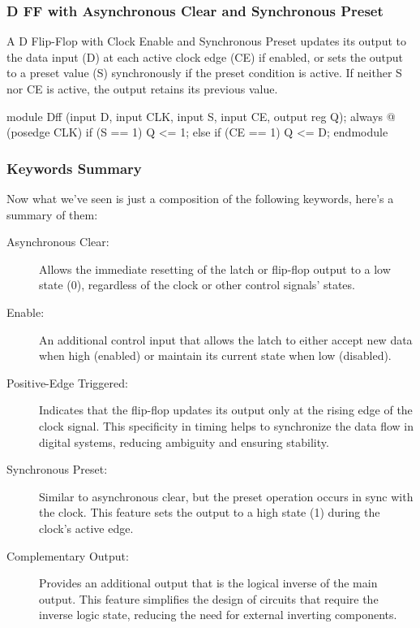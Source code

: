 \documentclass[12pt,openany]{book}
\begin{document}
\subsubsection{D FF with Asynchronous Clear and Synchronous Preset}
A D Flip-Flop with Clock Enable and Synchronous Preset updates its output to the data input (D) at each active clock edge (CE) if enabled, or sets the output to a preset value (S) synchronously if the preset condition is active. \vspace*{5px}
\newline If neither S nor CE is active, the output retains its previous value.
\begin{vhdl}
module Dff (input D, input CLK, input S, input CE, output reg Q);
	always @ (posedge CLK)
		if (S == 1)
			Q <= 1;
		else if (CE == 1)
			Q <= D;
endmodule
\end{vhdl}
\subsubsection{Keywords Summary}
Now what we've seen is just a composition of the following keywords, here's a summary of them:
\begin{footnotesize}
\begin{description}
    \item[Asynchronous Clear:] Allows the immediate resetting of the latch or flip-flop output to a low state (0), regardless of the clock or other control signals' states.
    \item[Enable:] An additional control input that allows the latch to either accept new data when high (enabled) or maintain its current state when low (disabled).
    \item[Positive-Edge Triggered:] Indicates that the flip-flop updates its output only at the rising edge of the clock signal. This specificity in timing helps to synchronize the data flow in digital systems, reducing ambiguity and ensuring stability.
    \item[Synchronous Preset:] Similar to asynchronous clear, but the preset operation occurs in sync with the clock. This feature sets the output to a high state (1) during the clock's active edge.
    \item[Complementary Output:] Provides an additional output that is the logical inverse of the main output. This feature simplifies the design of circuits that require the inverse logic state, reducing the need for external inverting components.
\end{description}
\end{footnotesize}
\end{document}
